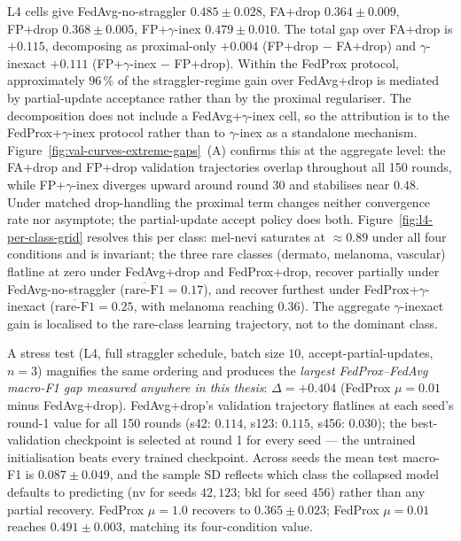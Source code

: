 L4 cells give FedAvg-no-straggler $0.485 \pm 0.028$, FA+drop
$0.364 \pm 0.009$, FP+drop $0.368 \pm 0.005$, FP+$\gamma$-inex
$0.479 \pm 0.010$. The total gap over FA+drop is $+0.115$, decomposing as
proximal-only $+0.004$ (FP+drop $-$ FA+drop) and $\gamma$-inexact $+0.111$
(FP+$\gamma$-inex $-$ FP+drop). Within the FedProx protocol, approximately
$96\,\%$ of the straggler-regime gain over FedAvg+drop is mediated by
partial-update acceptance rather than by the proximal regulariser. The
decomposition does not include a FedAvg+$\gamma$-inex cell, so the
attribution is to the FedProx+$\gamma$-inex protocol rather than to
$\gamma$-inex as a standalone mechanism.
Figure~\ref{fig:val-curves-extreme-gaps}~(A) confirms this at the aggregate
level: the FA+drop and FP+drop validation trajectories overlap throughout all
150 rounds, while FP+$\gamma$-inex diverges upward around round 30 and
stabilises near $0.48$. Under matched drop-handling the proximal term
changes neither convergence rate nor asymptote; the partial-update accept
policy does both. Figure~\ref{fig:l4-per-class-grid} resolves this per
class: mel-nevi saturates at $\approx 0.89$ under all four conditions and is
invariant; the three rare classes (dermato, melanoma, vascular) flatline at
zero under FedAvg+drop and FedProx+drop, recover partially under
FedAvg-no-straggler ($\overline{\text{rare-F1}} = 0.17$), and recover
furthest under FedProx+$\gamma$-inexact
($\overline{\text{rare-F1}} = 0.25$, with melanoma reaching $0.36$). The
aggregate $\gamma$-inexact gain is localised to the rare-class learning
trajectory, not to the dominant class.

A stress test (L4, full straggler schedule, batch size $10$,
accept-partial-updates, $n=3$) magnifies the same ordering and produces the
\emph{largest FedProx--FedAvg macro-F1 gap measured anywhere in this
thesis}: $\Delta = +0.404$ (FedProx $\mu = 0.01$ minus FedAvg+drop).
FedAvg+drop's
validation trajectory flatlines at each seed's round-1 value for all 150
rounds (s42: $0.114$, s123: $0.115$, s456: $0.030$); the best-validation
checkpoint is selected at round 1 for every seed --- the untrained
initialisation beats every trained checkpoint. Across seeds the mean test
macro-F1 is $0.087 \pm 0.049$, and the sample SD reflects which class the
collapsed model defaults to predicting (nv for seeds $42, 123$; bkl for seed
$456$) rather than any partial recovery. FedProx $\mu = 1.0$ recovers to
$0.365 \pm 0.023$; FedProx $\mu = 0.01$ reaches $0.491 \pm 0.003$, matching
its four-condition value.

